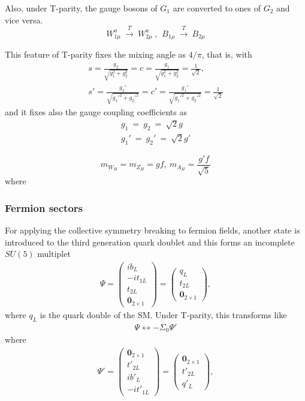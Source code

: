 Also, under T-parity, the gauge bosons of $G_1$ are converted to ones of $G_2$ and vice versa.
\begin{equation}
 W_{1\mu}^a ~ \xrightarrow{T} ~W_{2\mu}^a ~,~~
 B_{1\mu}~ \xrightarrow{T} ~B_{2\mu}
\end{equation}

This feature of T-parity fixes the mixing angle as $4/\pi$, that is, 
with \begin{align}
s=\frac{g_2}{\sqrt{g_1^2 + g_2^2}}=c=\frac{g_1}{\sqrt{g_1^2 + g_2^2}}=\frac{1}{\sqrt{2}}, \nonumber \\ 
s'=\frac{g_2'}{\sqrt{g_1'^2 + g_2'^2}} = c'=\frac{g_1'}{\sqrt{g_1'^2 + g_2'^2}} = \frac{1}{\sqrt{2}} 
\end{align}
and it fixes also the gauge coupling coefficients as 
\begin{align}
 g_1~=~g_2~=~\sqrt{2}g \nonumber\\
 g_1'~=~g_2'~=~\sqrt{2}g'
\end{align}

\begin{equation}
 m_{W_H}=m_{Z_H}= g f , ~ m_{A_H} = \frac{g'f}{\sqrt{5}}
 \label{eq:LHT:VH}
\end{equation}
where 

\subsubsection*{Fermion sectors}
For applying the collective symmetry breaking to fermion fields,
another state is introduced to the third generation quark doublet 
and this forms an incomplete $SU(5)$ multiplet
\begin{align}
  \Psi = \left( \begin{array}{c}
  i b_L \\
  -it_{1L} \\
  t_{2L} \\
  \mathbf{0}_{2\times1}
  \end{array}\right) 
  = \left( \begin{array}{c}
  q_L \\
  t_{2L} \\
  \mathbf{0}_{2\times1}
  \end{array}\right), 
\end{align}
where $q_L$ is the quark double of the SM. 
Under T-parity, this transforms like
\begin{align}
 \Psi \leftrightarrow - \Sigma_0 \Psi'
\end{align}
where
\begin{align}
  \Psi' = \left( \begin{array}{c}
  \mathbf{0}_{2\times1}\\
  t'_{2L} \\
  i b'_L \\
  -i t'_{1L} 
  \end{array}\right) 
  = \left( \begin{array}{c}
  \mathbf{0}_{2\times1}\\
  t'_{2L} \\
  q'_L 
  \end{array}\right), 
\end{align}



